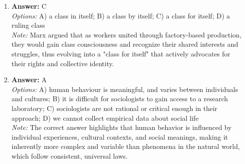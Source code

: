 \documentclass[12pt]{article}
\begin{document}
\begin{enumerate}[label=\arabic*.]
\item \textbf{Answer:} C
\\ \textit{Options:} A) a class in itself; B) a class by itself; C) a class for itself; D) a ruling class
\\ \textit{Note:} Marx argued that as workers united through factory-based production, they would gain class consciousness and recognize their shared interests and struggles, thus evolving into a "class for itself" that actively advocates for their rights and collective identity.
\item \textbf{Answer:} A
\\ \textit{Options:} A) human behaviour is meaningful, and varies between individuals and cultures; B) it is difficult for sociologists to gain access to a research laboratory; C) sociologists are not rational or critical enough in their approach; D) we cannot collect empirical data about social life
\\ \textit{Note:} The correct answer highlights that human behavior is influenced by individual experiences, cultural contexts, and social meanings, making it inherently more complex and variable than phenomena in the natural world, which follow consistent, universal laws.
\end{enumerate}
\end{document}
